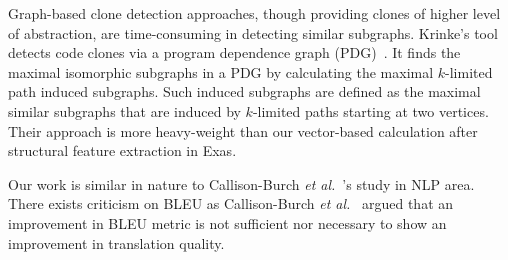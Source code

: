 Graph-based clone detection approaches, though providing clones
of higher level of abstraction, are time-consuming in detecting
similar subgraphs. Krinke's tool detects code clones via a program
dependence graph (PDG)~\cite{krinke01}. It finds the maximal
isomorphic subgraphs in a PDG by calculating the maximal $k$-limited
path induced subgraphs. Such induced subgraphs are defined as the
maximal similar subgraphs that are induced by $k$-limited paths
starting at two vertices. Their approach is more heavy-weight than our
vector-based calculation after structural feature extraction in Exas.




Our work is similar in nature to Callison-Burch {\em et
  al.}~\cite{Callison}'s study in NLP area. There exists criticism on
BLEU as Callison-Burch {\em et al.}~\cite{Callison} argued that an
improvement in BLEU metric is not sufficient nor necessary to show an
improvement in translation quality.
